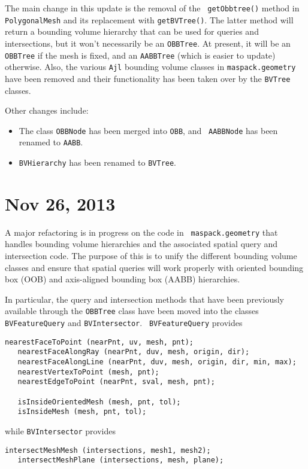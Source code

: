 \documentclass{article}
\begin{document}
The main change in this update is the removal of the {\tt
getObbtree()} method in {\tt PolygonalMesh} and its replacement with
{\tt getBVTree()}. The latter method will return a bounding
volume hierarchy that can be used for queries and intersections, but
it won't necessarily be an {\tt OBBTree}. At present, it will be an
{\tt OBBTree} if the mesh is fixed, and an {\tt AABBTree} (which is
easier to update) otherwise. Also, the various {\tt Ajl} bounding
volume classes in {\tt maspack.geometry} have been removed
and their functionality has been taken over by the {\tt BVTree}
classes.

Other changes include:

\begin{itemize}

\item The class {\tt OBBNode} has been merged into {\tt OBB}, and {\tt
AABBNode} has been renamed to {\tt AABB}.

\item {\tt BVHierarchy} has been renamed to {\tt BVTree}.

\end{itemize}

\section*{Nov 26, 2013}

A major refactoring is in progress on the code in {\tt
maspack.geometry} that handles bounding volume hierarchies and the
associated spatial query and intersection code. The purpose of this is
to unify the different bounding volume classes and ensure that spatial
queries will work properly with oriented bounding box (OOB) and
axis-aligned bounding box (AABB) hierarchies. 

In particular, the query and intersection methods that have been
previously available through the {\tt OBBTree} class have been moved
into the classes {\tt BVFeatureQuery} and {\tt BVIntersector}. {\tt
BVFeatureQuery} provides
\begin{lstlisting}[]
   nearestFaceToPoint (nearPnt, uv, mesh, pnt);
   nearestFaceAlongRay (nearPnt, duv, mesh, origin, dir);
   nearestFaceAlongLine (nearPnt, duv, mesh, origin, dir, min, max);
   nearestVertexToPoint (mesh, pnt);
   nearestEdgeToPoint (nearPnt, sval, mesh, pnt);

   isInsideOrientedMesh (mesh, pnt, tol);
   isInsideMesh (mesh, pnt, tol);
\end{lstlisting}
while {\tt BVIntersector} provides
\begin{lstlisting}[]
   intersectMeshMesh (intersections, mesh1, mesh2);
   intersectMeshPlane (intersections, mesh, plane);
\end{lstlisting}
\end{document}
